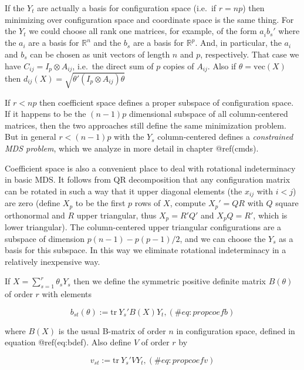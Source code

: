 \documentclass[
  12pt,
  letterpaper,
  DIV=11,
  numbers=noendperiod]{scrreprt}
\theoremstyle{remark}
\begin{document}
If the \(Y_t\) are actually a basis for configuration space (i.e.~if
\(r=np\)) then minimizing over configuration space and coordinate space
is the same thing. For the \(Y_t\) we could choose all rank one
matrices, for example, of the form \(a_i^{\ }b_s'\) where the \(a_i\)
are a basis for \(\mathbb{R}^n\) and the \(b_s\) are a basis for
\(\mathbb{R}^p\). And, in particular, the \(a_i\) and \(b_s\) can be
chosen as unit vectors of length \(n\) and \(p\), respectively. That
case we have \(C_{ij}=I_p\otimes A_{ij}\), i.e.~the direct sum of \(p\)
copies of \(A_{ij}\). Also if \(\theta=\text{vec}(X)\) then
\(d_{ij}(X)=\sqrt{\theta'(I_p\otimes A_{ij})\theta}\)

If \(r<np\) then coefficient space defines a proper subspace of
configuration space. If it happens to be the \((n -1)p\) dimensional
subspace of all column-centered matrices, then the two approaches still
define the same minimization problem. But in general \(r<(n-1)p\) with
the \(Y_s\) column-centered defines a \emph{constrained MDS problem},
which we analyze in more detail in chapter @ref(cmds).

Coefficient space is also a convenient place to deal with rotational
indeterminacy in basic MDS. It follows from QR decomposition that any
configuration matrix can be rotated in such a way that it upper diagonal
elements (the \(x_{ij}\) with \(i<j\)) are zero (define \(X_p\) to be
the first \(p\) rows of \(X\), compute \(X_p'=QR\) with \(Q\) square
orthonormal and \(R\) upper triangular, thus \(X_p=R'Q'\) and
\(X_pQ=R'\), which is lower triangular). The column-centered upper
triangular configurations are a subspace of dimension
\(p(n-1)-p(p-1)/2\), and we can choose the \(Y_s\) as a basis for this
subspace. In this way we eliminate rotational indeterminacy in a
relatively inexpensive way.

If \(X=\sum_{s=1}^r \theta_sY_s\) then we define the symmetric positive
definite matrix \(B(\theta)\) of order \(r\) with elements

\begin{equation}
b_{st}(\theta):=\text{tr}\ Y_s'B(X)Y_t,
(\#eq:propcoefb)
\end{equation}

where \(B(X)\) is the usual B-matrix of order \(n\) in configuration
space, defined in equation @ref(eq:bdef). Also define \(V\) of order
\(r\) by

\begin{equation}
v_{st}:=\text{tr}\ Y_s'VY_t,
(\#eq:propcoefv)
\end{equation}
\end{document}
